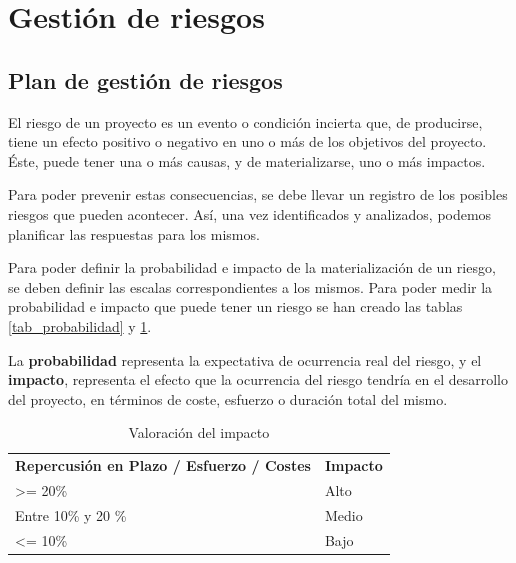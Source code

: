 
\section{Gestión de riesgos}

\subsection{Plan de gestión de riesgos}
El riesgo de un proyecto es un evento o condición incierta que, de producirse, tiene un efecto positivo o negativo en uno o más de los objetivos del proyecto. Éste, puede tener una o más causas, y de materializarse, uno o más impactos\cite{pmbok}.


Para poder prevenir estas consecuencias, se debe llevar un registro de los posibles riesgos que pueden acontecer. Así, una vez identificados y analizados, podemos planificar las respuestas para los mismos.


Para poder definir la probabilidad e impacto de la materialización de un riesgo, se deben definir las escalas correspondientes a los mismos. Para poder medir la probabilidad e impacto que puede tener un riesgo se han creado las tablas \ref{tab_probabilidad} y \ref{tab_impacto}.


La \textbf{probabilidad} representa la expectativa de ocurrencia real del riesgo, y el \textbf{impacto}, representa el efecto que la ocurrencia del riesgo tendría en el desarrollo del proyecto, en términos de coste, esfuerzo o duración total del mismo. 

\begin{table}[htpb]
\centering
\begin{tabular}{|l|l|}
\hline
\rowcolor[gray]{0.9}\multicolumn{2}{|c|}{\textbf{Valoración del impacto}}                                                  \\ \hline
\multicolumn{1}{|c|}{\textbf{Repercusión en Plazo / Esfuerzo / Costes}} & \multicolumn{1}{c|}{\textbf{Impacto}} \\ \hline
\textgreater= 20\%                                             & Alto                         \\ \hline
Entre 10\% y 20 \%                                             & Medio                        \\ \hline
\textless= 10\%                                                & Bajo                         \\ \hline
\end{tabular}
\caption{Valoración del impacto}
\label{tab_impacto}
\end{table}

